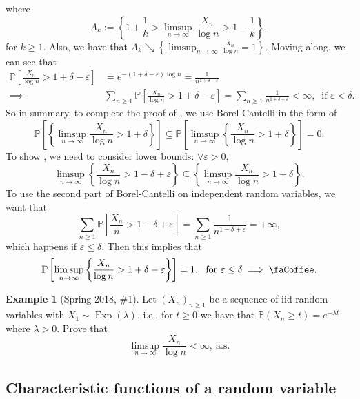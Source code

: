 \documentclass[12pt,reqno]{article}
\theoremstyle{plain}
\theoremstyle{definition}
\newtheorem{example}[theorem]{Example}
\newcommand{\PP}[1]{\ensuremath{\mathbb{P}\left(#1\right)}}
\begin{document}
where $$A_k := \left\{1+\frac{1}{k} > \limsup_{n \rightarrow \infty} \frac{X_n}{\log n} > 1 - \frac{1}{k}\right\},$$ 
for $k \geq 1$. Also, we have that $A_k \searrow \left\{\limsup_{n \rightarrow \infty} \frac{X_n}{\log n} = 1\right\}$. 
Moving along, we can see that 
\begin{align*} 
\mathbb{P}\left[\frac{X_n}{\log n} > 1 + \delta - \varepsilon\right] & = e^{-(1+\delta-\varepsilon)\log n} = 
     \frac{1}{n^{1+\delta-\varepsilon}} \\ 
     \implies & \sum_{n \geq 1} \mathbb{P}\left[\frac{X_n}{\log n} > 1 + \delta - \varepsilon\right] = 
     \sum_{n \geq 1} \frac{1}{n^{1+\delta-\varepsilon}} < \infty,\ \text{ if } \varepsilon < \delta. 
\end{align*} 
So in summary, to complete the proof of \faLinux, we use Borel-Cantelli in the form of 
\[
\mathbb{P}\left[\left\{\limsup_{n \rightarrow \infty} \frac{X_n}{\log n} > 1+\delta\right\}\right] \subseteq 
     \mathbb{P}\left[\limsup_{n \rightarrow \infty} \left\{\frac{X_n}{\log n} > 1 + \delta\right\}\right] = 0. 
\]
To show \faCoffee, we need to consider lower bounds: $\forall \varepsilon > 0$, 
\[
\limsup_{n \rightarrow \infty} \left\{\frac{X_n}{\log n} > 1-\delta+\varepsilon\right\} \subseteq 
     \left\{\limsup_{n \rightarrow \infty} \frac{X_n}{\log n} > 1 + \delta\right\}. 
\]
To use the second part of Borel-Cantelli on independent random variables, we want that 
\[
\sum_{n \geq 1} \mathbb{P}\left[\frac{X_n}{n} > 1-\delta+\varepsilon\right] = \sum_{n \geq 1} 
     \frac{1}{n^{1-\delta+\varepsilon}} = +\infty, 
\]
which happens if $\varepsilon \leq \delta$. Then this implies that 
\[
\mathbb{P}\left[\limsup_{n \rightarrow \infty} \left\{\frac{X_n}{\log n} > 1+\delta-\varepsilon\right\} 
     \right] = 1,\ \text{ for } \varepsilon \leq \delta \implies \text{\faCoffee}. 
\] 

\begin{example}[Spring 2018, \#1]
Let $(X_n)_{n \geq 1}$ be a sequence of iid random variables with 
$X_1 \sim \operatorname{Exp}(\lambda)$, i.e., for $t \geq 0$ we have that 
$\PP{X_n \geq t} = e^{-\lambda t}$ where $\lambda > 0$. Prove that 
\[
\limsup_{n \rightarrow \infty} \frac{X_n}{\log n} < \infty,\ \text{a.s.}
\] 
\end{example} 

\subsection{Characteristic functions of a random variable} 
\end{document}
